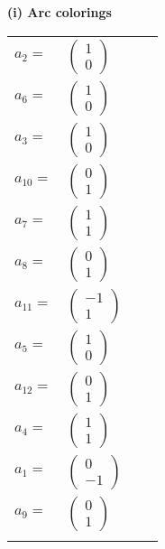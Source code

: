 \documentclass[1p]{elsarticle_modified}
\theoremstyle{definition}
\begin{document}
\flushleft \textbf{(i) Arc colorings}\\
\begin{tabular}{m{7pt} m{180pt} m{7pt} m{180pt} }
\flushright $a_{2}=$&$\begin{pmatrix}1\\0\end{pmatrix}$ \\
\flushright $a_{6}=$&$\begin{pmatrix}1\\0\end{pmatrix}$ \\
\flushright $a_{3}=$&$\begin{pmatrix}1\\0\end{pmatrix}$ \\
\flushright $a_{10}=$&$\begin{pmatrix}0\\1\end{pmatrix}$ \\
\flushright $a_{7}=$&$\begin{pmatrix}1\\1\end{pmatrix}$ \\
\flushright $a_{8}=$&$\begin{pmatrix}0\\1\end{pmatrix}$ \\
\flushright $a_{11}=$&$\begin{pmatrix}-1\\1\end{pmatrix}$ \\
\flushright $a_{5}=$&$\begin{pmatrix}1\\0\end{pmatrix}$ \\
\flushright $a_{12}=$&$\begin{pmatrix}0\\1\end{pmatrix}$ \\
\flushright $a_{4}=$&$\begin{pmatrix}1\\1\end{pmatrix}$ \\
\flushright $a_{1}=$&$\begin{pmatrix}0\\-1\end{pmatrix}$ \\
\flushright $a_{9}=$&$\begin{pmatrix}0\\1\end{pmatrix}$\\&\end{tabular}
\end{document}
